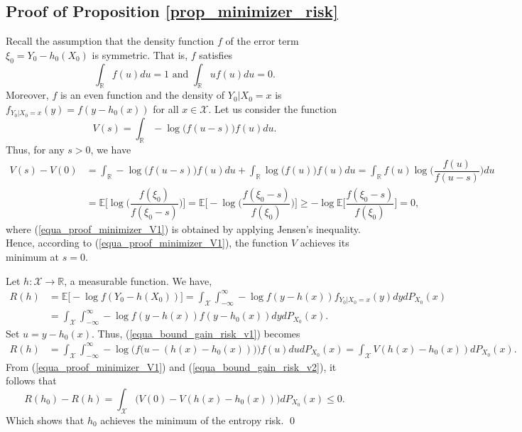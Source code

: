 \documentclass[10pt,twoside]{article}
\numberwithin{equation}{section}
\newcommand{\E}{\ensuremath{\mathbb{E}}}
\newcommand{\R}{\ensuremath{\mathbb{R}}}
\begin{document}
\medskip

\subsection{Proof of Proposition \ref{prop_minimizer_risk}}
%
%
Recall the assumption that the density function $f$ of the error term $\xi_0 = Y_0 - h_0(X_0)$ is symmetric. That is, $f$ satisfies
%
\begin{equation}\label{equa_proof_kernel_densitie_normalized}
    \displaystyle \int_\R f(u) du = 1 \text{ and }  \displaystyle \int_\R u f(u) du = 0.
\end{equation}
%
Moreover, $f$ is an even function and the density of $Y_0\big|X_0=x$ is $f_{Y_0\big|X_0=x}(y) = f(y - h_0(x))$ for all $x\in \mathcal{X}$. 
%
 Let us consider the function
%
\begin{equation}
    V(s) = \displaystyle \int_\R -\log \big(f(u - s) \big) f(u) du.
\end{equation}
%
Thus, for any $s > 0$, we have
%
\begin{align}\label{equa_proof_minimizer_V1}
 \nonumber V(s) - V(0) & =  \displaystyle \int_\R -\log \big(f(u - s) \big) f(u) du + \displaystyle \int_\R \log \big(f(u) \big) f(u) du   =  \displaystyle \int_\R f(u) \log \Big( \dfrac{f(u)}{f(u - s)} \Big) du \\
 &  = \E\Big[\log \Big(\dfrac{f(\xi_0)}{f(\xi_0 - s)} \Big)\Big]  =  \E\Big[-\log \Big(\dfrac{f(\xi_0 - s)}{f(\xi_0)} \Big)\Big] \ge - \log \E\Big[\dfrac{f(\xi_0 - s)}{f(\xi_0)} \Big] = 0, 
\end{align}
%
where (\ref{equa_proof_minimizer_V1}) is obtained by applying Jensen’s inequality.
%
Hence, according to (\ref{equa_proof_minimizer_V1}), the function $V$ achieves its minimum at $s = 0$.

\medskip

\noindent
Let $h: \mathcal{X} \to \R$, a measurable function.
%
We have,
%
\begin{align}\label{equa_bound_gain_risk_v1}
 \nonumber R(h) &= \E \Big[-\log f(Y_0 - h(X_0)) \Big] = \displaystyle \int_{\mathcal{X}} \displaystyle \int_{-\infty}^{\infty} -\log f(y - h(x)) f_{Y_0\big|X_0=x}(y)  dy d P_{X_0}(x)   \\
 & = \displaystyle \int_{\mathcal{X}} \displaystyle \int_{-\infty}^{\infty}-\log f(y - h(x)) f(y - h_0(x)) dy d P_{X_0}(x).
\end{align}
%
Set $u = y - h_0(x)$.
%
Thus, (\ref{equa_bound_gain_risk_v1}) becomes
%
\begin{align}\label{equa_bound_gain_risk_v2}
   R(h)  & = \displaystyle \int_{\mathcal{X}} \displaystyle \int_{-\infty}^{\infty} -\log \Big(f\big(u - (h(x) - h_0(x)) \big) \Big) f(u) du d P_{X_0}(x) 
 = \displaystyle \int_{\mathcal{X}}  V(h(x) - h_0(x))   d P_{X_0}(x).
\end{align}
%
From (\ref{equa_proof_minimizer_V1}) and (\ref{equa_bound_gain_risk_v2}), it follows that
%
\begin{equation}\label{equa_bound_gain_excess_risk_v1}
    R(h_0) - R(h) =   \displaystyle \int_{\mathcal{X}}  \Big(V(0) - V(h(x) - h_0(x)) \Big) d P_{X_0}(x) \leq 0.
\end{equation}
%
Which shows that $h_0$ achieves the minimum of the entropy risk.
%
\qed
 
\end{document}
